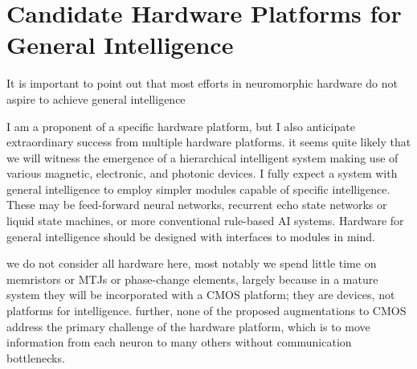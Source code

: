 \section{\label{sec:hardware}Candidate Hardware Platforms for General Intelligence}

\vspace{3em}
It is important to point out that most efforts in neuromorphic hardware do not aspire to achieve general intelligence

\vspace{3em}
I am a proponent of a specific hardware platform, but I also anticipate extraordinary success from multiple hardware platforms. it seems quite likely that we will witness the emergence of a hierarchical intelligent system making use of various magnetic, electronic, and photonic devices. I fully expect a system with general intelligence to employ simpler modules capable of specific intelligence. These may be feed-forward neural networks, recurrent echo state networks or liquid state machines, or more conventional rule-based AI systems. Hardware for general intelligence should be designed with interfaces to modules in mind.

\vspace{3em}
we do not consider all hardware here, most notably we spend little time on memristors or MTJs or phase-change elements, largely because in a mature system they will be incorporated with a CMOS platform; they are devices, not platforms for intelligence. further, none of the proposed augmentations to CMOS address the primary challenge of the hardware platform, which is to move information from each neuron to many others without communication bottlenecks.

\vspace{3em}














